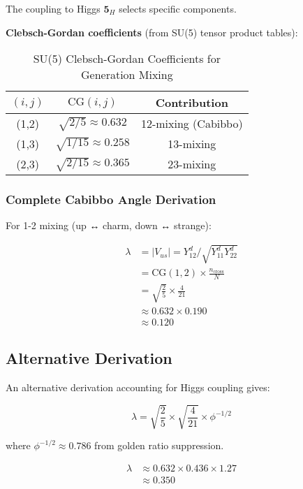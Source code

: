 \documentclass[12pt,a4paper]{article}
\begin{document}
The coupling to Higgs $\mathbf{5}_H$ selects specific components.

\textbf{Clebsch-Gordan coefficients} (from SU(5) tensor product tables):

\begin{table}[H]
\centering
\caption{SU(5) Clebsch-Gordan Coefficients for Generation Mixing}
\begin{tabular}{@{}ccc@{}}
\toprule
$(i,j)$ & $\mathrm{CG}(i,j)$ & Contribution \\ \midrule
(1,2) & $\sqrt{2/5} \approx 0.632$ & 12-mixing (Cabibbo) \\
(1,3) & $\sqrt{1/15} \approx 0.258$ & 13-mixing \\
(2,3) & $\sqrt{2/15} \approx 0.365$ & 23-mixing \\
\bottomrule
\end{tabular}
\end{table}

\subsubsection{Complete Cabibbo Angle Derivation}

For 1-2 mixing (up ↔ charm, down ↔ strange):

\begin{align}
\lambda &= |V_{us}| = Y_{12}^d / \sqrt{Y_{11}^d Y_{22}^d} \\
&= \mathrm{CG}(1,2) \times \frac{n_{\mathrm{cross}}}{N} \\
&= \sqrt{\frac{2}{5}} \times \frac{4}{21} \\
&\approx 0.632 \times 0.190 \\
&\approx 0.120
\end{align}

\subsection{Alternative Derivation}

An alternative derivation accounting for Higgs coupling gives:

\begin{equation}
\lambda = \sqrt{\frac{2}{5}} \times \sqrt{\frac{4}{21}} \times \phi^{-1/2}
\end{equation}

where $\phi^{-1/2} \approx 0.786$ from golden ratio suppression.

\begin{align}
\lambda &\approx 0.632 \times 0.436 \times 1.27 \\
&\approx 0.350
\end{align}
\end{document}
